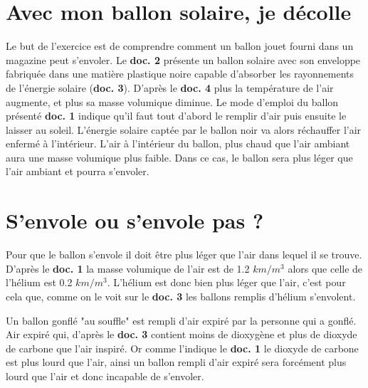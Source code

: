 \section{Avec mon ballon solaire, je décolle}

	Le but de l'exercice est de comprendre comment un ballon jouet fourni dans un magazine peut s'envoler.
	Le \textbf{doc. 2} présente un ballon solaire avec son enveloppe fabriquée dans une matière plastique noire capable d'absorber les rayonnements de l'énergie solaire (\textbf{doc. 3}).
	D'après le \textbf{doc. 4} plus la température de l'air augmente, et plus sa masse volumique diminue.
	Le mode d'emploi du ballon présenté \textbf{doc. 1} indique qu'il faut tout d'abord le remplir d'air puis ensuite le laisser au soleil.
	L'énergie solaire captée par le ballon noir va alors réchauffer l'air enfermé à l'intérieur. 
	L'air à l'intérieur du ballon, plus chaud que l'air ambiant aura une masse volumique plus faible.
	Dans ce cas, le ballon sera plus léger que l'air ambiant et pourra s'envoler.
	

\section{S'envole ou s'envole pas ?}

	Pour que le ballon s'envole il doit être plus léger que l'air dans lequel il se trouve. 
	D'après le \textbf{doc. 1} la masse volumique de l'air est de \num{1.2} $km/m^3$ alors que celle de l'hélium est \num{0.2} $km/m^3$. L'hélium est donc bien plus léger que l'air, c'est pour cela que, comme on le voit sur le \textbf{doc. 3} les ballons remplis d'hélium s'envolent. 
	
	Un ballon gonflé "au souffle" est rempli d'air expiré par la personne qui a gonflé. Air expiré qui, d'après le \textbf{doc. 3} contient moins de dioxygène et plus de dioxyde de carbone que l'air inspiré. Or comme l'indique le \textbf{doc. 1} le dioxyde de carbone est plus lourd que l'air, ainsi un ballon rempli d'air expiré sera forcément plus lourd que l'air et donc incapable de s'envoler. 